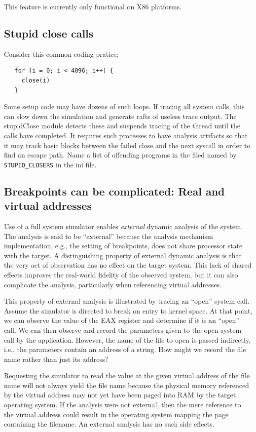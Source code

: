 \documentclass[titlepage]{article}
\begin{document}
\begin{appendices}
This feature is currently only functional on X86 platforms.

\subsection{Stupid close calls}
\label{stupid-close}
Consider this common coding pratice:
\begin{verbatim}
   for (i = 0; i < 4096; i++) {
     close(i)
   }
\end{verbatim}
Some setup code may have dozens of such loops.  If tracing all system calls, this can slow down the simulation and generate rafts of useless trace output.
The stupidClose module detects these and suspends tracing of the thread until the calls have completed.  It requires such processes to have analysis artifacts so
that it may track basic blocks between the failed close and the next syscall in order to find an escape path.
Name a list of offending programs in the filed named by {\tt STUPID\_CLOSERS} in the ini file.

\subsection{Breakpoints can be complicated: Real and virtual addresses}
\label{external}
Use of a full system simulator enables \textit{external} dynamic analysis of the system.  The analysis is said to be
“external” because the analysis mechanism implementation, e.g., the setting of breakpoints,  does not 
share processor state with the target.
A distinguishing property of external dynamic analysis is that the very act of observation has no effect on the target
system.  This lack of shared effects improves the real-world fidelity of the observed system, but it can also complicate the
analysis, particularly when referencing virtual addresses. 

This property of external analysis is illustrated by tracing an “open” system call. 
Assume the simulator is directed to break on entry to kernel space.  At that point, we can observe the value
of the EAX register and determine if it is an “open” call.  We can then observe and record the
parameters given to the open system call by the application.  However, the name of the file to open
is passed indirectly, i.e., the parameters contain an address of a string.  How might we record
the file name rather than just its address?   

Requesting the simulator to read the value at the given virtual address of the
file name will not always yield the file name because the
physical memory referenced by the virtual address may not yet have been paged into RAM by the target operating system.
If the analysis were not external, then the mere reference to the virtual address could result in the
operating system mapping the page containing the filename.  An external analysis has no such side effects.


\end{appendices}
\end{document}
